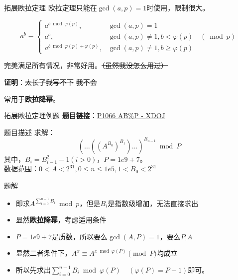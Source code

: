 \begin{frame}[fragile]{拓展欧拉定理}
  欧拉定理只能在$\gcd(a,p)=1$时使用，限制很大。
  \pause
  \begin{theorem}[拓展欧拉定理]
    \begin{equation*}
      a^{b} \equiv\left\{\begin{array}{ll}
      a^{b \bmod \varphi(p)}, & \operatorname{gcd}(a, p)=1 \\
      a^{b}, & \operatorname{gcd}(a, p) \neq 1, b<\varphi(p) \quad(\bmod p) \\
      a^{b \bmod \varphi(p)+\varphi(p)}, & \operatorname{gcd}(a, p) \neq 1, b \geq \varphi(p)
      \end{array}\right.
    \end{equation*}
  \end{theorem}

  \pause 
  \vspace{0.3cm}
  完美满足所有情况，非常好用。\sout{（虽然我没怎么用过）}
  
  \pause
  \vspace{0.3cm}
  \textbf{证明}：\sout{太长了我写不下}\hspace{0.3cm} \sout{我不会}

  \pause 
  \vspace{0.3cm}
  常用于\textbf{欧拉降幂}。

\end{frame}

\begin{frame}[fragile]{拓展欧拉定理}{例题}
  \textbf{题目链接}：\href{https://acm.xidian.edu.cn/problem.php?id=1066}{P1066 A\^B\%P - XDOJ}
  \begin{block}{题目描述}
    求解：
    $$
    (\dots ((A^{B_0})^{B_1})\dots)^{B_{n-1}}\bmod{P}
    $$
    其中，$B_i=B_{i-1}^2-1(i>0)$，$P=1e9+7$。\\
    数据范围：$0<A<2^{31},0\le n\le 1e5,1<B_0<2^{31}$
  \end{block}
  \pause
  \begin{exampleblock}{题解}
    \begin{itemize}
      \item 即求$A^{\sum\limits_{i=0}^{n-1}B_i}\bmod{p}$，但是$B_i$是指数级增加，无法直接求出
      \pause 
      \item 显然\textbf{欧拉降幂}，考虑适用条件
      \item $P=1e9+7$是质数，所以要么$\gcd(A,P)=1$，要么$P|A$
      \pause 
      \item 显然二者条件下，$A^{x}\equiv A^{x\bmod \varphi(P)} \pmod{P}$均成立
      \item 所以先求出$\sum\limits_{i=0}^{n-1}B_i\bmod{\varphi(P)}\;\;\;\;(\varphi(P)=P-1)$即可。
    \end{itemize}
  \end{exampleblock}
\end{frame}